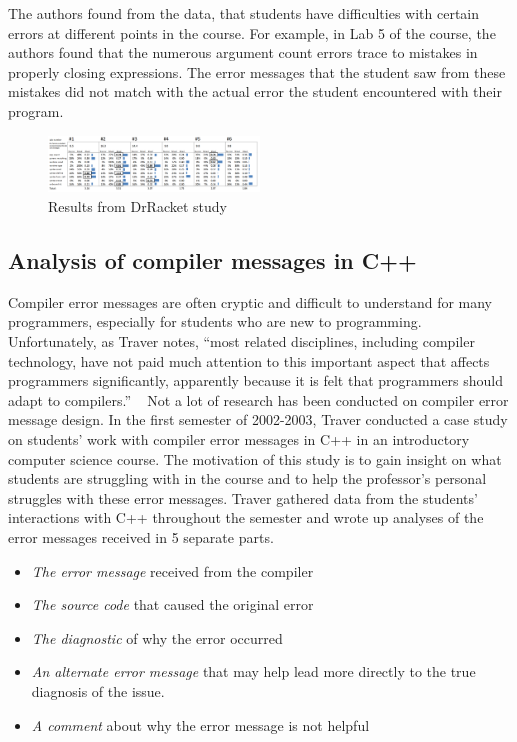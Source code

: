 \documentclass{sig-alternate}
\begin{document}
The authors found from the data, that students have difficulties with certain errors at different points in the course.
For example, in Lab 5 of the course, the authors found that the numerous argument count errors trace to mistakes in properly closing expressions.
The error messages that the student saw from these mistakes did not match with the actual error the student encountered with their program. 


\begin{figure}[t!]
  \centering
  \includegraphics[keepaspectratio, width=0.5\textwidth]{MEE_Data.png}
  \caption{Results from DrRacket study}
  \label{fig:drracketstudy}
\end{figure}


\subsection{Analysis of compiler messages in C++}\label{subsec:compiler analysis}
Compiler error messages are often cryptic and difficult to understand for many programmers, especially for students who are new to programming.
Unfortunately, as Traver notes, ``most related disciplines, including compiler technology, have not paid much attention to this important aspect that affects programmers significantly, apparently because it is felt that programmers should adapt to compilers.'' ~\cite{Traver:2010}
Not a lot of research has been conducted on compiler error message design.
In the first semester of 2002-2003, Traver conducted a case study on students' work with compiler error messages in C++ in an introductory computer science course.
The motivation of this study is to gain insight on what students are struggling with in the course and to help the professor's personal struggles with these error messages.
Traver gathered data from the students' interactions with C++ throughout the semester and wrote up analyses of the error messages received in 5 separate parts.
\begin{itemize}
	\item \textit{The error message} received from the compiler
	\item \textit{The source code} that caused the original error
	\item \textit{The diagnostic} of why the error occurred
	\item \textit{An alternate error message} that may help lead more directly to the true diagnosis of the issue.
	\item \textit{A comment} about why the error message is not helpful
\end{itemize}
\end{document}
